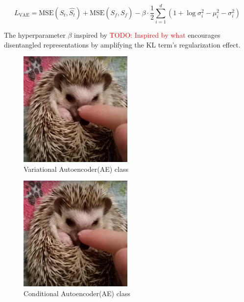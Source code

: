 \documentclass[12pt]{article}
\newcommand{\todo}[1]{\textcolor{red}{TODO: #1}}
\begin{document}
$$
L_{\text{VAE}} = \text{MSE}(S_t, \hat{S_t})+ \text{MSE}(S_f, \hat{S_f}) - \beta \cdot \frac{1}{2} \sum_{i=1}^{d }(1 + \log \sigma_{i}^{2} - \mu_i^{2} - \sigma_i^{2})
$$

The hyperparameter $\beta$ inspired by \todo{Inspired by what } encourages disentangled representations by amplifying the KL term’s regularization effect.




\begin{figure}[htbp]
    \centering
    \includegraphics[width=0.5\textwidth]{dummy.png}
    \caption{Variational Autoencoder(AE) class}
    \label{fig:vae-class}
\end{figure}

\begin{figure}[htbp]
    \centering
    \includegraphics[width=0.5\textwidth]{dummy.png}
    \caption{Conditional Autoencoder(AE) class}
    \label{fig:cvae-class}
\end{figure}
\end{document}
